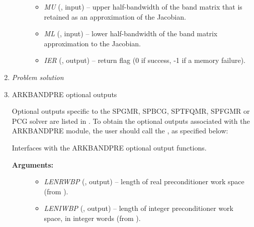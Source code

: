 \documentclass[letterpaper,10pt,english]{sphinxmanual}
\begin{document}
\begin{enumerate}
\begin{fulllineitems}
\begin{description}
\begin{itemize}
\item {} 
\emph{MU} (, input) -- upper half-bandwidth of the
band matrix that is retained as an approximation of the
Jacobian.

\item {} 
\emph{ML}  (, input) -- lower half-bandwidth of the
band matrix approximation to the Jacobian.

\item {} 
\emph{IER}  (, output) -- return flag  (0 if success, -1
if a memory failure).

\end{itemize}

\end{description}

\end{fulllineitems}


\item {} 
\emph{Problem solution}

\item {} 
ARKBANDPRE optional outputs

Optional outputs specific to the SPGMR, SPBCG, SPTFQMR, SPFGMR or
PCG solver are listed in {\hyperref[f_interface/Optional_output:finterface-spilsiouttable]{\emph{}}}.  To
obtain the optional outputs associated with the ARKBANDPRE module,
the user should call the {\hyperref[f_interface/Preconditioning:f/_/FARKBPOPT]{\emph{}}}, as specified below:

\begin{fulllineitems}
\label{f_interface/Preconditioning:f/_/FARKBPOPT}
Interfaces with the ARKBANDPRE optional output functions.
\begin{description}
\item[{\textbf{Arguments:}}] \leavevmode\begin{itemize}
\item {} 
\emph{LENRWBP} (, output) -- length of real
preconditioner work space (from
{\hyperref[c_interface/Preconditioners:c.ARKBandPrecGetWorkSpace]{\emph{}}}).

\item {} 
\emph{LENIWBP} (, output) -- length of integer
preconditioner work space, in integer words (from
{\hyperref[c_interface/Preconditioners:c.ARKBandPrecGetWorkSpace]{\emph{}}}).


\end{itemize}
\end{description}
\end{fulllineitems}
\end{enumerate}
\end{document}
